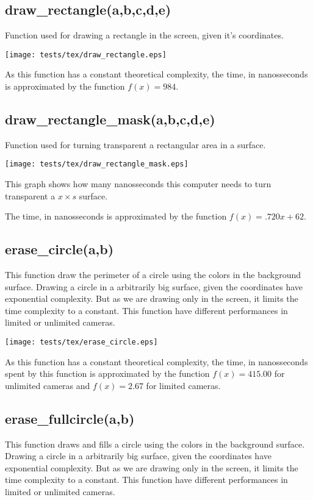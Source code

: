 \documentclass{article}
\begin{document}
\subsection{draw\_rectangle(a,b,c,d,e)}
Function used for drawing a rectangle in the
screen, given it's coordinates. 

\texttt{[image: tests/tex/draw\_rectangle.eps]}

As this function has a constant theoretical
complexity, the time, in nanosseconds is 
approximated by the function $f(x)=984$.
\subsection{draw\_rectangle\_mask(a,b,c,d,e)}
Function used for turning transparent a 
rectangular area in a surface. 

\texttt{[image: tests/tex/draw\_rectangle\_mask.eps]}

This graph shows how many nanosseconds this computer needs to turn transparent a $x \times s$ surface.

The time, in nanosseconds is 
approximated by the function $f(x)=.720x+62$.
\subsection{erase\_circle(a,b)}
This function draw the perimeter of a circle using
the colors in the background surface. Drawing a
circle in a arbitrarily big surface, given the
coordinates have exponential complexity. But as
we are drawing only in the screen, it limits 
the time complexity to a constant. This function
have different performances in limited or unlimited
cameras.

\texttt{[image: tests/tex/erase\_circle.eps]}

As this function has a constant
theoretical complexity, the time, in nanosseconds
spent by this function is 
approximated by the function $f(x)=415.00$
for unlimited cameras and $f(x)=2.67$ for
limited cameras.
\subsection{erase\_fullcircle(a,b)}
This function draws and fills a circle using
the colors in the background surface. Drawing a
circle in a arbitrarily big surface, given the
coordinates have exponential complexity. But as
we are drawing only in the screen, it limits 
the time complexity to a constant. This function
have different performances in limited or unlimited
cameras.
\end{document}
